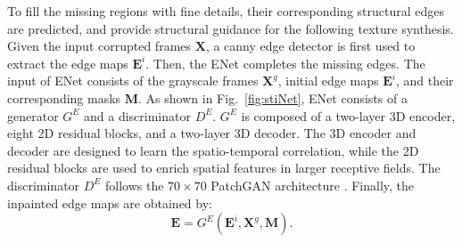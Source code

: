To fill the missing regions with fine details, their corresponding structural edges are predicted, and provide structural guidance for the following texture synthesis.
%
Given the input corrupted frames $\boldsymbol{X}$, a canny edge detector is first used to extract the edge maps $\boldsymbol{E}^{i}$. %
Then, the ENet completes the missing edges.
The input of ENet consists of the grayscale frames $\boldsymbol{X}^{g}$, initial edge maps $\boldsymbol{E}^{i}$, and their corresponding masks $\boldsymbol{M}$.
%
As shown in Fig.~\ref{fig:stiNet}, ENet consists of a generator $G^E$ and a discriminator $D^E$.
$G^E$ is composed of a two-layer 3D encoder, eight 2D residual blocks, and a two-layer 3D decoder. 
The 3D encoder and decoder are designed to learn the spatio-temporal correlation, while the 2D residual blocks are used to enrich spatial features in larger receptive fields. The discriminator $D^E$ follows the $70\times 70$ PatchGAN architecture \cite{Isola_2017_CVPR}. 
Finally, the inpainted edge maps are obtained by:
\begin{equation}
	\label{eq:edgenet}
	\boldsymbol{E}=G^E(\boldsymbol{E}^{i},\boldsymbol{X}^{g},\boldsymbol{M}).
\end{equation}

